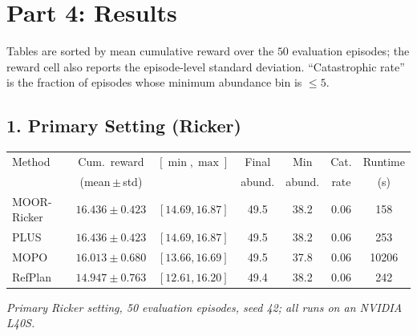 \documentclass[11pt]{article}
\begin{document}
\newpage

\section*{Part 4: Results}
Tables are sorted by mean cumulative reward over the $50$ evaluation episodes; the
reward cell also reports the episode-level standard deviation. ``Catastrophic
rate'' is the fraction of episodes whose minimum abundance bin is $\le 5$.

\subsection*{1. Primary Setting (Ricker)}
\begin{center}
\begin{tabular}{lcccccc}
\toprule
Method & Cum.\ reward & $[\min,\max]$ & Final & Min & Cat. & Runtime \\
       & (mean\,$\pm$\,std) &        & abund. & abund. & rate & (s) \\
\midrule
MOOR-Ricker & $16.436 \pm 0.423$ & $[14.69, 16.87]$ & 49.5 & 38.2 & 0.06 & 158 \\
PLUS        & $16.436 \pm 0.423$ & $[14.69, 16.87]$ & 49.5 & 38.2 & 0.06 & 253 \\
MOPO        & $16.013 \pm 0.680$ & $[13.66, 16.69]$ & 49.5 & 37.8 & 0.06 & 10206 \\
RefPlan     & $14.947 \pm 0.763$ & $[12.61, 16.20]$ & 49.4 & 38.2 & 0.06 & 242 \\
\bottomrule
\end{tabular}
\end{center}
\noindent\textit{Primary Ricker setting, 50 evaluation episodes, seed 42; all runs
on an NVIDIA L40S.}

\end{document}

